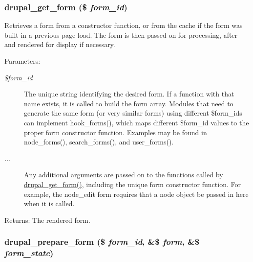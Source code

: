 \hypertarget{group__form__api_g720df81a837b06dfe19daf1c1eea3437}{
\subsubsection[{drupal\_\-get\_\-form}]{\setlength{\rightskip}{0pt plus 5cm}drupal\_\-get\_\-form (\$ {\em form\_\-id})}}
\label{group__form__api_g720df81a837b06dfe19daf1c1eea3437}


Retrieves a form from a constructor function, or from the cache if the form was built in a previous page-load. The form is then passed on for processing, after and rendered for display if necessary.

\begin{Desc}
\item[Parameters:]
\begin{description}
\item[{\em \$form\_\-id}]The unique string identifying the desired form. If a function with that name exists, it is called to build the form array. Modules that need to generate the same form (or very similar forms) using different \$form\_\-ids can implement hook\_\-forms(), which maps different \$form\_\-id values to the proper form constructor function. Examples may be found in node\_\-forms(), search\_\-forms(), and user\_\-forms(). \item[{\em ...}]Any additional arguments are passed on to the functions called by \hyperlink{group__form__api_g720df81a837b06dfe19daf1c1eea3437}{drupal\_\-get\_\-form()}, including the unique form constructor function. For example, the node\_\-edit form requires that a node object be passed in here when it is called. \end{description}
\end{Desc}
\begin{Desc}
\item[Returns:]The rendered form. \end{Desc}
\hypertarget{group__form__api_g79309515217249c16c7e4a7117141120}{
\subsubsection[{drupal\_\-prepare\_\-form}]{\setlength{\rightskip}{0pt plus 5cm}drupal\_\-prepare\_\-form (\$ {\em form\_\-id}, \/  \&\$ {\em form}, \/  \&\$ {\em form\_\-state})}}
\label{group__form__api_g79309515217249c16c7e4a7117141120}


